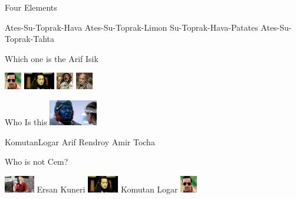 \documentclass{exam}
\begin{document}
\begin{questions}
\question Four Elements\newline
\begin{oneparchoices}
\choice Ates-Su-Toprak-Hava
\choice Ates-Su-Toprak-Limon
\choice Su-Toprak-Hava-Patates
\choice Ates-Su-Toprak-Tahta
\end{oneparchoices}
\question Which one is the Arif Isik\newline
\begin{oneparchoices}
\choice \includegraphics[height=2em]{arifisik.jpg}
\choice \includegraphics[height=2em]{komutanlogar.jpeg}
\choice \includegraphics[height=2em]{faruk.jpg}
\choice \includegraphics[height=2em]{216.jpg}
\end{oneparchoices}
\question Who Is this\newline
\includegraphics[height=3em]{rendroy2.jpg} \newline
\begin{oneparchoices}
\choice KomutanLogar
\choice Arif
\choice Rendroy
\choice Amir Tocha
\end{oneparchoices}
\question Who is not Cem?\newline
\begin{oneparchoices}
\choice \includegraphics[height=2em]{ersan.jpg}
Ersan Kuneri
\choice \includegraphics[height=2em]{komutanlogar.jpeg}
Komutan Logar
\choice \includegraphics[height=2em]{arifisik.jpg}

\end{oneparchoices}
\end{questions}
\end{document}

